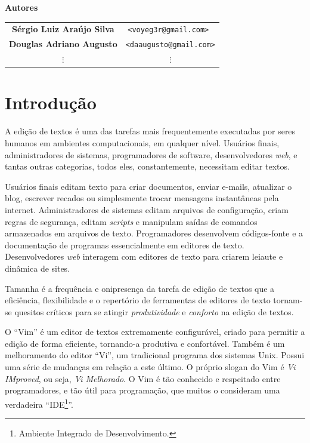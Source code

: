 \documentclass[10pt,a4paper,openany]{book}
\begin{document}
\newpage

\begin{center}
{\Huge \bf Autores}

\vspace{2cm}

\begin{tabular}{cc}

\bf Sérgio Luiz Araújo Silva & \tt <voyeg3r@gmail.com> \\
\bf Douglas Adriano Augusto & \tt <daaugusto@gmail.com>\\
$\vdots$ & $\vdots$ \\

\end{tabular}

\end{center}

\newpage
\tableofcontents

\chapter{Introdução}

A edição de textos é uma das tarefas mais frequentemente executadas por seres
humanos em ambientes computacionais, em qualquer nível. Usuários finais,
administradores de sistemas, programadores de software, desenvolvedores {\em
web}, e tantas outras categorias, todos eles, constantemente, necessitam
editar textos. 

Usuários finais editam texto para criar documentos, enviar e-mails, atualizar
o blog, escrever recados ou simplesmente trocar mensagens instantâneas pela
internet. Administradores de sistemas editam arquivos de configuração, criam
regras de segurança, editam {\em scripts} e manipulam saídas de comandos
armazenados em arquivos de texto. Programadores desenvolvem códigos-fonte e a
documentação de programas essencialmente em editores de texto.  Desenvolvedores {\em web}
interagem com editores de texto para criarem leiaute e dinâmica de sites.

Tamanha é a frequência e onipresença da tarefa de edição de textos que a
eficiência, flexibilidade e o repertório de ferramentas de editores de texto
tornam-se quesitos críticos para se atingir {\em produtividade} e {\em
conforto} na edição de textos.


O ``Vim'' é um editor de textos extremamente configurável, criado para
permitir a edição de forma eficiente, tornando-a produtiva e confortável. 
Também é um melhoramento do editor ``Vi'', um tradicional programa dos
sistemas Unix. Possui uma série de mudanças em relação a este último. O
próprio slogan do Vim é {\em Vi IMproved}, ou seja, {\em Vi Melhorado}.  O Vim
é tão conhecido e respeitado entre programadores, e tão útil para programação,
que muitos o consideram uma verdadeira ``IDE\footnote{Ambiente Integrado de
Desenvolvimento.}''.
\end{document}
